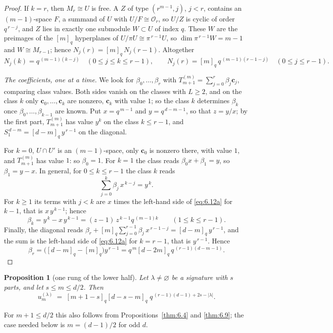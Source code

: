 \documentclass[11pt]{article}
\numberwithin{equation}{section}
\theoremstyle{plain}
\newtheorem{proposition}[theorem]{Proposition}
\theoremstyle{definition}
\begin{document}
\begin{proof}
If $k=r$, then $M_r\cong U$ is free. A $Z$ of type $(r^{m-1},j)$, $j<r$, contains an
$(m-1)$-space $F$, a summand of $U$ with $U/F\cong\mathcal{O}_r$, so $U/Z$ is cyclic of
order $q^{\,r-j}$, and $Z$ lies in exactly one submodule $W\subset U$ of index $q$. These
$W$ are the preimages of the $[m]_q$ hyperplanes of $U/\pi U\cong\pi^{\,r-1}U$, so
$\dim\pi^{\,r-1}W=m-1$ and $W\cong M_{r-1}$; hence $N_j(r)=[m]_q\,N_j(r-1)$. Altogether
\[
N_j(k)=q^{\,(m-1)(k-j)}\quad(0\le j\le k\le r-1),\qquad
N_j(r)=[m]_q\,q^{\,(m-1)(r-1-j)}\quad(0\le j\le r-1).
\]

\emph{The coefficients, one at a time.} We look for $\beta_0,\dots,\beta_r$ with
$T^{(m)}_{m+1}=\sum_{j=0}^{r}\beta_j\mathbf c_j$, comparing class values. Both sides vanish
on the classes with $L\ge2$, and on the class $k$ only $\mathbf c_0,\dots,\mathbf c_k$ are
nonzero, $\mathbf c_k$ with value $1$; so the class $k$ determines $\beta_k$ once
$\beta_0,\dots,\beta_{k-1}$ are known. Put $x=q^{\,m-1}$ and $y=q^{\,d-m-1}$, so that
$z=y/x$; by the first part, $T^{(m)}_{m+1}$ has value $y^{k}$ on the class $k\le r-1$, and
$S^{\,d-m}_1=[d-m]_q\,y^{\,r-1}$ on the diagonal.

For $k=0$, $U\cap U'$ is an $(m-1)$-space, only $\mathbf c_0$ is nonzero there, with value
$1$, and $T^{(m)}_{m+1}$ has value $1$: so $\beta_0=1$. For $k=1$ the class reads
$\beta_0x+\beta_1=y$, so $\beta_1=y-x$. In general, for $0\le k\le r-1$ the class $k$ reads
\begin{equation}\label{eq:6.12a}
\sum_{j=0}^{k}\beta_j\,x^{\,k-j}=y^{\,k}.
\end{equation}
For $k\ge1$ its terms with $j<k$ are $x$ times the left-hand side of \eqref{eq:6.12a} for
$k-1$, that is $x\,y^{\,k-1}$; hence
\[
\beta_k=y^{\,k}-x\,y^{\,k-1}=(z-1)\,z^{\,k-1}q^{\,(m-1)k}\qquad(1\le k\le r-1).
\]
Finally, the diagonal reads $\beta_r+[m]_q\sum_{j=0}^{r-1}\beta_j\,x^{\,r-1-j}=[d-m]_q\,y^{\,r-1}$,
and the sum is the left-hand side of \eqref{eq:6.12a} for $k=r-1$, that is $y^{\,r-1}$. Hence
\[
\beta_r=\bigl([d-m]_q-[m]_q\bigr)y^{\,r-1}=q^{\,m}[d-2m]_q\,q^{\,(r-1)(d-m-1)} .
\]
\end{proof}

\begin{proposition}[one rung of the lower half]\label{thm:6.13}
Let $\lambda\ne\varnothing$ be a signature with $s$ parts, and let $s\le m\le d/2$. Then
\[
u^{(\lambda)}_m\;=\;[m+1-s]_q[d-s-m]_q\;q^{\,(r-1)(d-1)+2s-|\lambda|} .
\]
\end{proposition}

For $m+1\le d/2$ this also follows from Propositions~\ref{thm:6.4} and \ref{thm:6.9};
the case needed below is $m=(d-1)/2$ for odd $d$.
\end{document}
